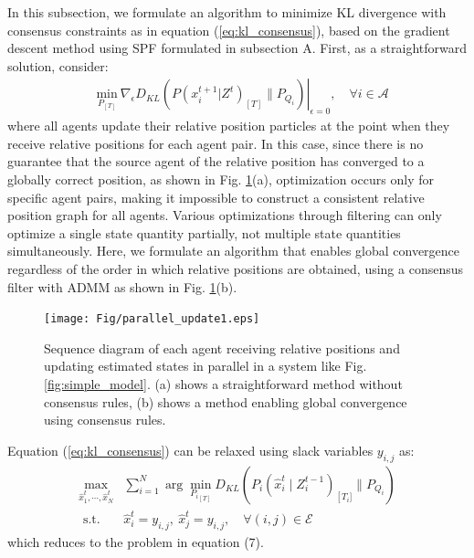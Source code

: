 \documentclass[a4paper,fleqn,10pt,twocolumn]{SICE_ISCS}
\begin{document}
In this subsection, we formulate an algorithm to minimize KL divergence with consensus constraints as in equation (\ref{eq:kl_consensus}), based on the gradient descent method using SPF formulated in subsection A. First, as a straightforward solution, consider:
\begin{equation}
\begin{aligned}
&\underset{P_{[T]}}{\text{min}} \: \nabla_\epsilon \left . D_{KL}(P(x_i^{t+1}|Z^{t})_{[T]} \| P_{Q_i})\right |_{\epsilon = 0}, \quad 
\forall i\in \mathcal{A}
\end{aligned}
\end{equation}
where all agents update their relative position particles at the point when they receive relative positions for each agent pair. In this case, since there is no guarantee that the source agent of the relative position has converged to a globally correct position, as shown in Fig. \ref{fig:parallel_update}(a), optimization occurs only for specific agent pairs, making it impossible to construct a consistent relative position graph for all agents. Various optimizations through filtering can only optimize a single state quantity partially, not multiple state quantities simultaneously. Here, we formulate an algorithm that enables global convergence regardless of the order in which relative positions are obtained, using a consensus filter with ADMM as shown in Fig. \ref{fig:parallel_update}(b).

\begin{figure}[t]
	\begin{center}
		\texttt{[image: Fig/parallel\_update1.eps]}
		\caption{Sequence diagram of each agent receiving relative positions and updating estimated states in parallel in a system like Fig. \ref{fig:simple_model}. (a) shows a straightforward method without consensus rules, (b) shows a method enabling global convergence using consensus rules.}
		\label{fig:parallel_update}
	\end{center}
	\vspace{-2mm}
\end{figure}

Equation (\ref{eq:kl_consensus}) can be relaxed using slack variables $y_{i,j}$ as:
\begin{equation}
\begin{aligned}
\max _{\hat x_{1}^{t}, \cdots, \hat x_{N}^{t}} & \sum_{i=1}^{N} \arg \min _{{P_{i}}_{[T]}} D_{K L}\left(P_{i}\left(\hat x_{i}^{t} \mid Z_{i}^{t-1}\right)_{\left[T_{i}]\right.} \| P_{Q_{i}} \right) \\
\text { s.t. } & \hat x_{i}^{t}=y_{i,j}, \:\hat x_{j}^{t}=y_{i,j}, \quad\forall(i, j) \in \mathcal{E}
\label{eq:kl_consensus_relaxed}
\end{aligned}
\end{equation}
which reduces to the problem in equation (7).
\end{document}
